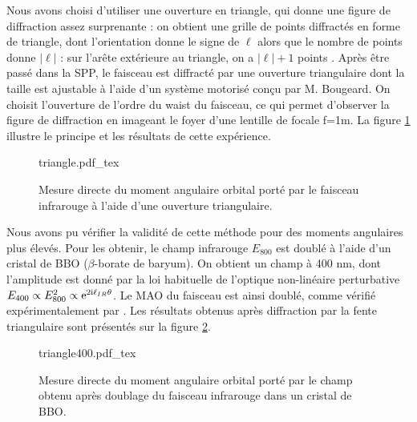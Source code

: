 Nous avons choisi d'utiliser une ouverture en triangle, qui donne une figure de diffraction assez surprenante : on obtient une grille de points diffractés en forme de triangle, dont l'orientation donne le  signe de $\ell$ alors que le nombre de points donne $\left|\ell\right|$ : sur l'arête extérieure au triangle, on a $\left|\ell\right|+1$ points . Après être passé dans la SPP, le faisceau est diffracté par une ouverture triangulaire dont la taille est ajustable à l'aide d'un système motorisé conçu par M. Bougeard. On choisit l'ouverture de l'ordre du waist du faisceau, ce qui permet d'observer la figure de diffraction en imageant le foyer d'une lentille de focale f=1m. La figure \ref{Fig:Triangle} illustre le principe et les résultats de cette expérience. 

\begin{figure}[!ht]
\centering
\def\svgwidth{1.0\columnwidth}
{triangle.pdf_tex}
\caption{Mesure directe du moment angulaire orbital porté par le faisceau infrarouge à l'aide d'une ouverture triangulaire.}
\label{Fig:Triangle}
\end{figure}

Nous avons pu vérifier la validité de cette méthode pour des moments angulaires plus élevés. Pour les obtenir, le champ infrarouge $E_{800}$ est doublé à l'aide d'un cristal de BBO ($\beta$-borate de baryum). On obtient un champ à 400 nm, dont l'amplitude est donné par la loi habituelle de l'optique non-linéaire perturbative $E_{400}\propto E_{800}^2\propto \mathrm{e}^{2\mathrm{i}\ell_{IR}\theta}$. Le MAO du faisceau est ainsi doublé, comme vérifié expérimentalement par . Les résultats obtenus après diffraction par la fente triangulaire sont présentés sur la figure \ref{Fig:Triangle400}. 

\begin{figure}[!ht]
\centering
\def\svgwidth{0.5\columnwidth}
{triangle400.pdf_tex}
\caption{Mesure directe du moment angulaire orbital porté par le champ obtenu après doublage du faisceau infrarouge dans un cristal de BBO.}
\label{Fig:Triangle400}
\end{figure}

